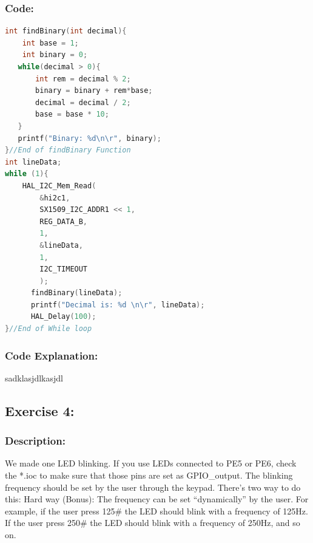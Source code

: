 \documentclass[english]{article}
\begin{document}
\subsubsection{Code:}
\begin{lstlisting}[language=C, caption={Reading Line Data}, label={lst:label} ]
int findBinary(int decimal){
	int base = 1;
	int binary = 0;
   while(decimal > 0){
	   int rem = decimal % 2;
	   binary = binary + rem*base;
	   decimal = decimal / 2;
	   base = base * 10;
   }
   printf("Binary: %d\n\r", binary);
}//End of findBinary Function
int lineData;
while (1){
    HAL_I2C_Mem_Read(
        &hi2c1,
        SX1509_I2C_ADDR1 << 1,
        REG_DATA_B,
        1,
        &lineData,
        1,
        I2C_TIMEOUT
        );
	  findBinary(lineData);
	  printf("Decimal is: %d \n\r", lineData);
	  HAL_Delay(100);
}//End of While loop
\end{lstlisting}
\subsubsection{Code Explanation:}
sadklasjdlkasjdl

\newpage
\subsection{Exercise 4:}
\subsubsection{Description:}
We made one LED blinking. If you use LEDs connected to PE5 or PE6, check the *.ioc to make sure that those pins are set as GPIO\_output. The blinking frequency should be
set by the user through the keypad. There’s two way to do this:
Hard way (Bonus): The frequency can be set “dynamically” by the user. For example, if the user
press 125\# the LED should blink with a frequency of 125Hz. If the user press 250\# the LED should
blink with a frequency of 250Hz, and so on.
\end{document}
